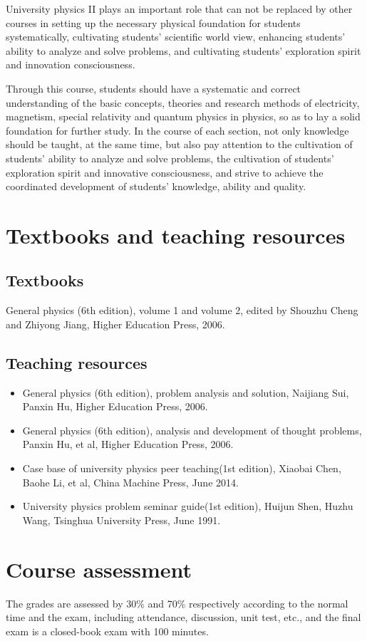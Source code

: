 \documentclass[10pt,a4paper,oneside]{article}
\begin{document}
University physics II plays an important role that can not be replaced by other courses in setting up the necessary physical foundation for students systematically, cultivating students' scientific world view, enhancing students' ability to analyze and solve problems, and cultivating students' exploration spirit and innovation consciousness.

Through this course, students should have a systematic and correct understanding of the basic concepts, theories and research methods of electricity, magnetism, special relativity and quantum physics in physics, so as to lay a solid foundation for further study. In the course of each section, not only knowledge should be taught, at the same time, but also pay attention to the cultivation of students' ability to analyze and solve problems, the cultivation of students' exploration spirit and innovative consciousness, and strive to achieve the coordinated development of students' knowledge, ability and quality.
\section{Textbooks and teaching resources}
\subsection{Textbooks}
General physics (6th edition), volume 1 and volume 2, edited by Shouzhu Cheng and Zhiyong Jiang, Higher Education Press, 2006.
\subsection{Teaching resources}
\begin{itemize}
	\item General physics (6th edition), problem analysis and solution,  Naijiang Sui, Panxin Hu, Higher Education Press, 2006.
	\item General physics (6th edition), analysis and development of thought problems, Panxin Hu, et al, Higher Education Press, 2006.
	\item Case base of university physics peer teaching(1st edition), Xiaobai Chen, Baohe Li, et al, China Machine Press, June 2014.
	\item University physics problem seminar guide(1st edition), Huijun Shen, Huzhu Wang, Tsinghua University Press,  June 1991.
\end{itemize}
\section{Course assessment}
The grades are assessed by 30\% and 70\% respectively according to the normal time and the exam, including attendance, discussion, unit test, etc., and the final exam is a closed-book exam with 100 minutes.
\end{document}
